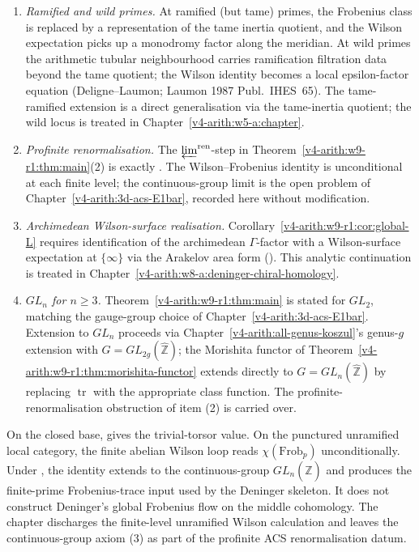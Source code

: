 \begin{enumerate}
\item \emph{Ramified and wild primes.}
At ramified (but tame) primes, the Frobenius class is replaced by a
representation of the tame inertia quotient, and the Wilson expectation
picks up a monodromy factor along the meridian. At wild primes the
arithmetic tubular neighbourhood carries ramification filtration data
beyond the tame quotient; the Wilson identity becomes a local
epsilon-factor equation (Deligne--Laumon; Laumon 1987 Publ.~IHES~65).
The tame-ramified extension is a direct generalisation via the
tame-inertia quotient; the wild locus is treated in
Chapter~\ref{v4-arith:w5-a:chapter}.

\item \emph{Profinite renormalisation.} The
\(\varprojlim^{\mathrm{ren}}\)-step in
Theorem~\ref{v4-arith:w9-r1:thm:main}(2) is exactly
. The Wilson--Frobenius identity is
unconditional at each finite level; the continuous-group limit is the
open problem of Chapter~\ref{v4-arith:3d-acs-E1bar}, recorded here
without modification.

\item \emph{Archimedean Wilson-surface realisation.}
Corollary~\ref{v4-arith:w9-r1:cor:global-L} requires identification of
the archimedean \(\Gamma\)-factor with a Wilson-surface expectation at
\(\{\infty\}\) via the Arakelov area form
(). This analytic continuation
is treated in Chapter~\ref{v4-arith:w8-a:deninger-chiral-homology}.

\item \emph{\(GL_{n}\) for \(n\geq 3\).}
Theorem~\ref{v4-arith:w9-r1:thm:main} is stated for \(GL_{2}\), matching
the gauge-group choice of Chapter~\ref{v4-arith:3d-acs-E1bar}. Extension
to \(GL_{n}\) proceeds via
Chapter~\ref{v4-arith:all-genus-koszul}'s genus-\(g\) extension with
\(G=GL_{2g}(\widehat{\mathbb Z})\); the Morishita functor of
Theorem~\ref{v4-arith:w9-r1:thm:morishita-functor} extends directly to
\(G=GL_{n}(\widehat{\mathbb Z})\) by replacing \(\operatorname{tr}\)
with the appropriate class function. The profinite-renormalisation
obstruction of item (2) is carried over.
\end{enumerate}

\begin{remark}
\label{v4-arith:w9-r1:rem:abelian-closed}
On the closed base, 
gives the trivial-torsor value. On the punctured unramified local
category, the finite abelian Wilson loop reads
\(\chi(\mathrm{Frob}_{p})\) unconditionally. Under
, the identity extends to the
continuous-group \(GL_{n}(\widehat{\mathbb Z})\) and produces the
finite-prime Frobenius-trace input used by the Deninger skeleton. It
does not construct Deninger's global Frobenius flow on the middle
cohomology. The chapter discharges the finite-level unramified Wilson
calculation and leaves the continuous-group axiom
(3) as part of the profinite ACS
renormalisation datum.
\end{remark}

